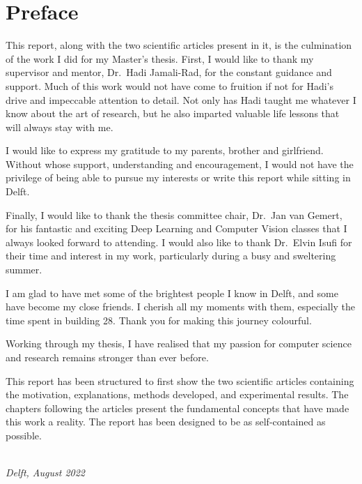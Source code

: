 \chapter*{Preface}

This report, along with the two scientific articles present in it, is the culmination of the work I did for my Master's thesis. First, I would like to thank my supervisor and mentor, Dr.~Hadi Jamali-Rad, for the constant guidance and support. Much of this work would not have come to fruition if not for Hadi's drive and impeccable attention to detail. Not only has Hadi taught me whatever I know about the art of research, but he also imparted valuable life lessons that will always stay with me.

I would like to express my gratitude to my parents, brother and girlfriend. Without whose support, understanding and encouragement, I would not have the privilege of being able to pursue my interests or write this report while sitting in Delft.

Finally, I would like to thank the thesis committee chair, Dr.~Jan van Gemert, for his fantastic and exciting Deep Learning and Computer Vision classes that I always looked forward to attending. I would also like to thank Dr.~Elvin Isufi for their time and interest in my work, particularly during a busy and sweltering summer.

I am glad to have met some of the brightest people I know in Delft, and some have become my close friends. I cherish all my moments with them, especially the time spent in building 28. Thank you for making this journey colourful.

Working through my thesis, I have realised that my passion for computer science and research remains stronger than ever before.

This report has been structured to first show the two scientific articles containing the motivation, explanations, methods developed, and experimental results. The chapters following the articles present the fundamental concepts that have made this work a reality. The report has been designed to be as self-contained as possible.

\begin{flushright}
{\makeatletter\itshape
    \@author \\
    Delft, August 2022
\makeatother}
\end{flushright}